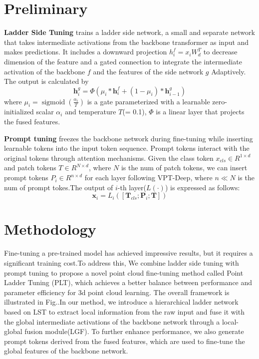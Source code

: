 \section{Preliminary}
\label{sec:preliminary}

\textbf{Ladder Side Tuning}\cite{sung2022lst} trains a ladder side network, a small and separate network that takes intermediate activations from the backbone transformer as input and makes predictions. It includes a downward projection $h_i^f=x_iW_d^T$ to decrease dimension of the feature and a gated connection to integrate the intermediate activation of the backbone $f$ and the features of the side network $g$ Adaptively. The output is calculated by
\begin{equation}
    \boldsymbol{h}_{i}^{g}=\Phi(\mu_{i} * \boldsymbol{h}_{i}^{f}+\left(1-\mu_{i}\right) * \boldsymbol{h}_{i-1}^{g})
\end{equation}
where $\mu_{i}=\operatorname{sigmoid}\left(\frac{\alpha_{i}}{T}\right)$ is a gate parameterized with a learnable zero-initialized scalar $\alpha_i$ and temperature $T$(= 0.1), $\Phi$ is a linear layer that projects the fused features.

\textbf{Prompt tuning}\cite{li2021prefix,jia2022visual} freezes the backbone network during fine-tuning while inserting learnable tokens into the input token sequence. Prompt tokens interact with the original tokens through attention mechanisms. Given the class token $x_{cls}\in R^{1 
\times d}$ and patch tokens $T \in R^{N \times d}$, where $N$ is the num of patch tokens, we can insert prompt tokens $P_i \in R^{n \times d}$ for each layer following VPT-Deep\cite{jia2022visual}, where $n \ll N$ is the num of prompt tokes.The output of $i$-th layer($L(\cdot)$) is expressed as follows:
\begin{equation}
    \boldsymbol{x}_{i}=L_{i}\left(\left[\boldsymbol{T}_{c l s} ; \boldsymbol{P}_{i} ; \boldsymbol{T}\right]\right)
\end{equation}



\section{Methodology}
\label{sec:methodology}
Fine-tuning a pre-trained model has achieved impressive results, but it requires a significant training cost.To address this, We combine ladder side tuning with prompt tuning to propose a novel point cloud fine-tuning method called Point Ladder Tuning (PLT), which achieves a better balance between performance and parameter efficiency for 3d point cloud learning. The overall framework is illustrated in Fig..In our method, we introduce a hierarchical ladder network based on LST to extract local information from the raw input and fuse it with the global intermediate activations of the backbone network through a local-global fusion module(LGF). To further enhance performance, we also generate prompt tokens derived from the fused features, which are used to fine-tune the global features of the backbone network.

